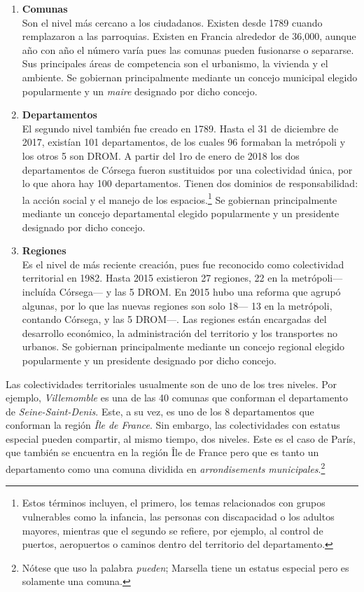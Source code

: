 \begin{enumerate}
\item \textbf{Comunas} \\ 
Son el nivel más cercano a los ciudadanos. Existen desde 1789 cuando remplazaron a las parroquias. Existen en Francia alrededor de 36,000, aunque año con año el número varía pues las comunas pueden fusionarse o separarse. Sus principales áreas de competencia son el urbanismo, la vivienda y el ambiente. Se gobiernan principalmente mediante un concejo municipal elegido popularmente y un \textit{maire} designado por dicho concejo.

\item \textbf{Departamentos}\\ 
El segundo nivel también fue creado en 1789. Hasta el 31 de diciembre de 2017, existían 101 departamentos, de los cuales 96 formaban la metrópoli y los otros 5 son DROM. A partir del  1ro de enero de 2018 los dos departamentos de Córsega fueron sustituidos por una colectividad única, por lo que ahora hay 100 departamentos. Tienen dos dominios de responsabilidad: la acción social y el manejo de los espacios.\footnote{Estos términos incluyen, el primero, los temas relacionados con grupos vulnerables como la infancia, las personas con discapacidad o los adultos mayores, mientras que el segundo se refiere, por ejemplo, al control de puertos, aeropuertos o caminos dentro del territorio del departamento.} Se gobiernan principalmente mediante un concejo departamental elegido popularmente y un presidente designado por dicho concejo.

\item \textbf{Regiones}\\ 
Es el nivel de más reciente creación, pues fue reconocido como colectividad territorial en 1982. Hasta 2015 existieron 27 regiones, 22 en la metrópoli--- incluída Córsega--- y las 5 DROM. En 2015 hubo una reforma que agrupó algunas, por lo que las nuevas regiones son solo 18--- 13 en la metrópoli, contando Córsega, y las 5 DROM---. Las regiones están encargadas del desarrollo económico, la administración del territorio y los transportes no urbanos. Se gobiernan principalmente mediante un concejo regional elegido popularmente y un presidente designado por dicho concejo.
\end{enumerate} 

Las colectividades territoriales usualmente son de uno de los tres niveles. Por ejemplo, \textit{Villemomble} es una de las 40 comunas que conforman el departamento de \textit{Seine-Saint-Denis}. Este, a su vez, es uno de los 8 departamentos que conforman la región \textit{Île de France}. Sin embargo, las colectividades con estatus especial pueden compartir, al mismo tiempo, dos niveles. Este es el caso de París, que también se encuentra en la región Île de France pero que es tanto un departamento como una comuna dividida en \textit{arrondisements municipales}.\footnote{Nótese que uso la palabra \textit{pueden}; Marsella tiene un estatus especial pero es solamente una comuna.}\\

